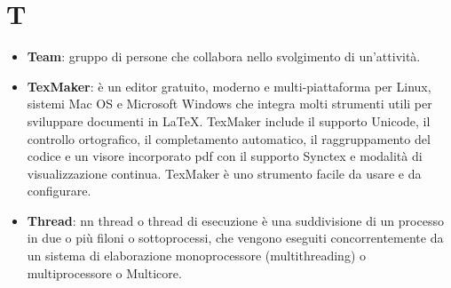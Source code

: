 \section{T}
\begin{itemize}
	\item
	\textbf{Team}: gruppo di persone che collabora nello svolgimento di un'attività.
	\item
	\textbf{TexMaker}: è un editor gratuito, moderno e multi-piattaforma per Linux, sistemi Mac OS e Microsoft Windows che integra molti strumenti utili per sviluppare documenti in \LaTeX{}.
	TexMaker include il supporto Unicode, il controllo ortografico, il completamento automatico, il raggruppamento del codice e un visore incorporato pdf con il supporto Synctex e modalità di visualizzazione continua.
	TexMaker è uno strumento facile da usare e da configurare.
	\item
	\textbf{Thread}: nn thread o thread di esecuzione è una suddivisione di un processo in due o più filoni o sottoprocessi, che vengono eseguiti concorrentemente da un sistema di elaborazione monoprocessore (multithreading) o multiprocessore o Multicore.
	
\end{itemize}
